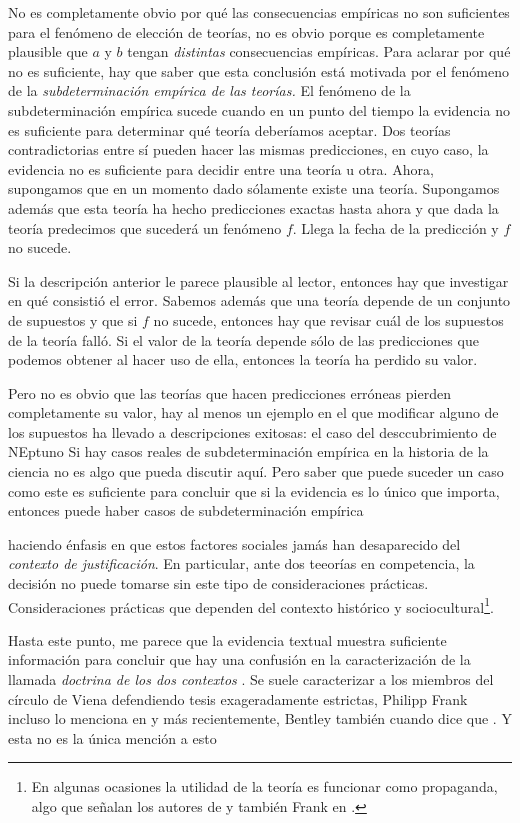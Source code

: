 No es completamente obvio por qué las consecuencias empíricas no son suficientes para el fenómeno de elección de teorías, no es obvio porque es completamente plausible que $a$ y $b$ tengan \emph{distintas} consecuencias empíricas.
Para aclarar por qué no es suficiente, hay que saber que esta conclusión está motivada por el fenómeno de la \emph{subdeterminación empírica de las teorías.}
El fenómeno de la subdeterminación empírica sucede cuando en un punto del tiempo la evidencia no es suficiente para determinar qué teoría deberíamos aceptar.
Dos teorías contradictorias entre sí pueden hacer las mismas predicciones, en cuyo caso, la evidencia no es suficiente para decidir entre una teoría u otra.
Ahora, supongamos que en un momento dado sólamente existe una teoría.
Supongamos además que esta teoría ha hecho predicciones exactas hasta ahora y que dada la teoría predecimos que sucederá un fenómeno $f$.
Llega la fecha de la predicción y $f$ no sucede.

Si la descripción anterior le parece plausible al lector, entonces hay que investigar en qué consistió el error.
Sabemos además que una teoría depende de un conjunto de supuestos y que si $f$ no sucede, entonces hay que revisar cuál de los supuestos de la teoría falló.
Si el valor de la teoría depende sólo de las predicciones que podemos obtener al hacer uso de ella, entonces la teoría ha perdido su valor.

Pero no es obvio que las teorías que hacen predicciones erróneas pierden completamente su valor, hay al menos un ejemplo en el que modificar alguno de los supuestos ha llevado a descripciones exitosas: el caso del desccubrimiento de NEptuno  
Si hay casos reales de subdeterminación empírica en la historia de la ciencia no es algo que pueda discutir aquí.
Pero saber que puede suceder un caso como este es suficiente para concluir que si la evidencia es lo único que importa, entonces puede haber casos de subdeterminación empírica 



haciendo énfasis en que estos factores sociales jamás han desaparecido del \emph{contexto de justificación}.
En particular, ante dos teeorías en competencia, la decisión no puede tomarse sin este tipo de consideraciones prácticas.
Consideraciones prácticas que dependen del contexto histórico y sociocultural\footnote{En algunas ocasiones la utilidad de la teoría es funcionar como propaganda, algo que señalan los autores de \parencite{Lewontin2017}  y también Frank en \parencite{}.}.

Hasta este punto, me parece que la evidencia textual muestra suficiente información para concluir que hay una confusión en la caracterización de la llamada \emph{doctrina de los dos contextos} \parencite{Yturbe1995}.
Se suele caracterizar a los miembros del círculo de Viena defendiendo tesis exageradamente estrictas, Philipp Frank incluso lo menciona en  y más recientemente, Bentley también cuando dice que .
Y esta no es la única mención a esto 


